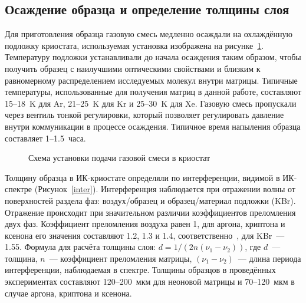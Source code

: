 \subsection{Осаждение образца и определение толщины слоя}
Для приготовления образца газовую смесь медленно осаждали на охлаждённую подложку криостата, используемая установка изображена на рисунке~\ref{dep}. 
Температуру подложки устанавливали до начала осаждения таким образом, чтобы получить образец с наилучшими оптическими свойствами и близким к равномерному 
распределением исследуемых молекул внутри матрицы. Типичные температуры, использованные для получения матриц в данной работе, составляют 
15--18~K для Ar, 21--25~K для Kr и 25--30~K для Xe. Газовую смесь пропускали через вентиль тонкой регулировки, который позволяет регулировать давление 
внутри коммуникации в процессе осаждения. Типичное время напыления образца составляет 1--1.5~часа.
\begin{figure}[H]
\caption{Схема установки подачи газовой смеси в криостат}
\label{dep}
\end{figure}
Толщину образца в ИК-криостате определяли по интерференции, видимой в ИК-спектре (Рисунок~\ref{inter}). 
Интерференция наблюдается при отражении волны от поверхностей раздела фаз: воздух/образец и образец/материал подложки (KBr). 
Отражение происходит при значительном различии коэффициентов преломления двух фаз. Коэффициент преломления воздуха равен 1, 
для  аргона, криптона и ксенона его значения составляют 1.2, 1.3 и 1.4, соответственно~\cite{Sinnock1980}, 
для KBr~--- 1.55. Формула для расчёта толщины слоя: $d = 1/(2n(\nu_1-\nu_2))$, где $d$~--- толщина, $n$~--- коэффициент преломления
матрицы, $(\nu_1-\nu_2)$~--- длина периода интерференции, наблюдаемая в спектре. Толщины образцов в проведённых экспериментах составляют 
120--200~мкм для неоновой матрицы и 70--120~мкм в случае аргона, криптона и ксенона.
